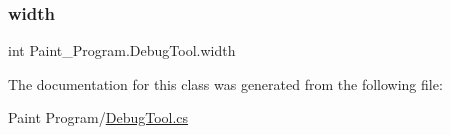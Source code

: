 \subsubsection{\texorpdfstring{width}{width}}
{\footnotesize\ttfamily int Paint\+\_\+\+Program.\+Debug\+Tool.\+width\hspace{0.3cm}{\ttfamily [private]}}



The documentation for this class was generated from the following file\+:\begin{DoxyCompactItemize}
\item 
Paint Program/\mbox{\hyperlink{_debug_tool_8cs}{Debug\+Tool.\+cs}}\end{DoxyCompactItemize}
